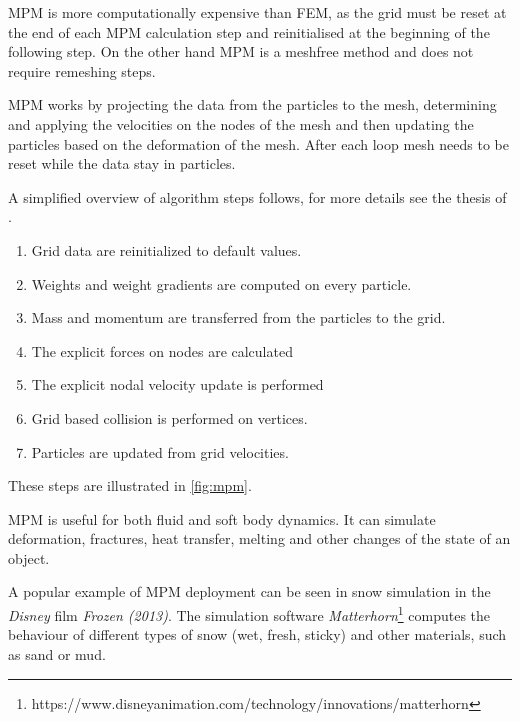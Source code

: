 MPM is more computationally expensive than FEM, as the grid must be reset at the end of each MPM calculation step and reinitialised at the beginning of the following step. On the other hand MPM is a meshfree method and does not require remeshing steps. 

MPM works by projecting the data from the particles to the mesh, determining and applying the velocities on the nodes of the mesh and then updating the particles based on the deformation of the mesh. After each loop mesh needs to be reset while the data stay in particles.

 A simplified overview of algorithm steps follows, for more details see the thesis of \citet{jiang2015material}.
 
\begin{enumerate}
    \item Grid data are reinitialized to default values.
    \item Weights and weight gradients are computed on every particle.
    \item Mass and momentum are transferred from the particles to the grid.
    \item The explicit forces on nodes are calculated
    \item The explicit nodal velocity update is performed
    \item Grid based collision is performed on vertices.
    \item Particles are updated from grid velocities.
\end{enumerate}
These steps are illustrated in \cref{fig:mpm}.

MPM is useful for both fluid and soft body dynamics. It can simulate deformation, fractures, heat transfer, melting and other changes of the state of an object.

A popular example of MPM deployment can be seen in snow simulation in the \emph{Disney} film \emph{Frozen (2013)}. The simulation software \emph{Matterhorn}\footnote{https://www.disneyanimation.com/technology/innovations/matterhorn} computes the behaviour of different types of snow (\eg wet, fresh, sticky) and other materials, such as sand or mud.

